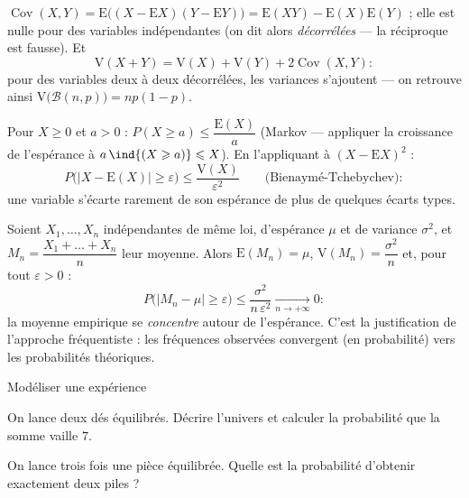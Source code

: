 \begin{theoreme}
$\operatorname{Cov}(X,Y)
=\mathrm{E}\bigl((X-\mathrm{E}X)(Y-\mathrm{E}Y)\bigr)
=\mathrm{E}(XY)-\mathrm{E}(X)\mathrm{E}(Y)$ ; elle est nulle pour des
variables indépendantes (on dit alors \emph{décorrélées} — la réciproque
est fausse). Et
\[
\mathrm{V}(X+Y)=\mathrm{V}(X)+\mathrm{V}(Y)+2\operatorname{Cov}(X,Y) :
\]
pour des variables deux à deux décorrélées, les variances s'ajoutent — on
retrouve ainsi $\mathrm{V}\bigl(\mathcal{B}(n,p)\bigr)=np(1-p)$.
\end{theoreme}


\begin{theoreme}
Pour $X\geqslant0$ et $a>0$ :
$P(X\geqslant a)\leqslant\dfrac{\mathrm{E}(X)}{a}$ (Markov — appliquer la
croissance de l'espérance à $a\,\ind{(X\geqslant a)}\leqslant X$). En
l'appliquant à $(X-\mathrm{E}X)^{2}$ :
\[
P\bigl(|X-\mathrm{E}(X)|\geqslant\varepsilon\bigr)
\leqslant\frac{\mathrm{V}(X)}{\varepsilon^{2}}
\qquad\text{(Bienaymé-Tchebychev)} :
\]
une variable s'écarte rarement de son espérance de plus de quelques écarts
types.
\end{theoreme}

\begin{theoreme}
Soient $X_1,\dots,X_n$ indépendantes de même loi, d'espérance $\mu$ et de
variance $\sigma^{2}$, et $M_n=\dfrac{X_1+\dots+X_n}{n}$ leur moyenne.
Alors $\mathrm{E}(M_n)=\mu$, $\mathrm{V}(M_n)=\dfrac{\sigma^{2}}{n}$ et,
pour tout $\varepsilon>0$ :
\[
P\bigl(|M_n-\mu|\geqslant\varepsilon\bigr)
\leqslant\frac{\sigma^{2}}{n\,\varepsilon^{2}}
\xrightarrow[n\to+\infty]{}0 :
\]
la moyenne empirique se \emph{concentre} autour de l'espérance. C'est la
justification de l'approche fréquentiste : les fréquences observées
convergent (en probabilité) vers les probabilités théoriques.
\end{theoreme}

\exercices
{}

\begin{exercice}[1]{Modéliser une expérience}
\begin{questions}
  \item On lance deux dés équilibrés. Décrire l'univers et calculer la
    probabilité que la somme vaille $7$.
  \item On lance trois fois une pièce équilibrée. Quelle est la
    probabilité d'obtenir exactement deux piles ?
\end{questions}
\end{exercice}

